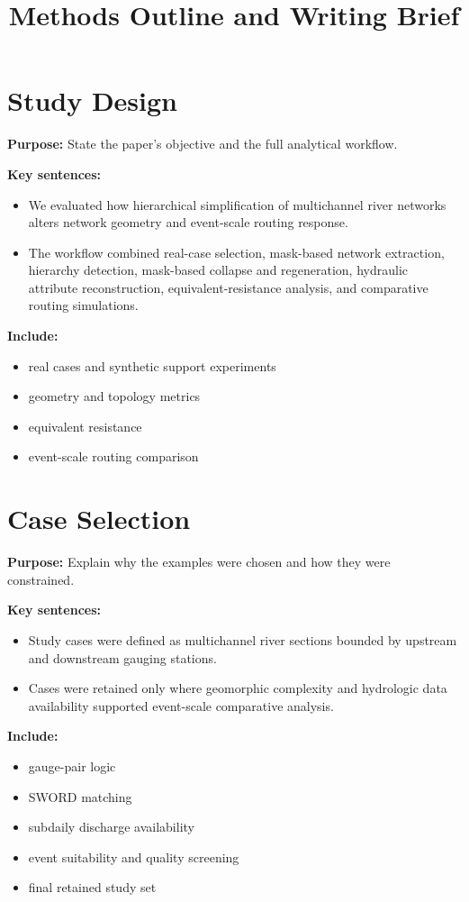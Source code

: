 \documentclass[11pt]{article}
\title{Methods Outline and Writing Brief}
\author{}
\date{}
\begin{document}
\maketitle

\section{Study Design}
\textbf{Purpose:} State the paper's objective and the full analytical workflow.

\textbf{Key sentences:}
\begin{itemize}
\item We evaluated how hierarchical simplification of multichannel river networks alters network geometry and event-scale routing response.
\item The workflow combined real-case selection, mask-based network extraction, hierarchy detection, mask-based collapse and regeneration, hydraulic attribute reconstruction, equivalent-resistance analysis, and comparative routing simulations.
\end{itemize}

\textbf{Include:}
\begin{itemize}
\item real cases and synthetic support experiments
\item geometry and topology metrics
\item equivalent resistance
\item event-scale routing comparison
\end{itemize}

\section{Case Selection}
\textbf{Purpose:} Explain why the examples were chosen and how they were constrained.

\textbf{Key sentences:}
\begin{itemize}
\item Study cases were defined as multichannel river sections bounded by upstream and downstream gauging stations.
\item Cases were retained only where geomorphic complexity and hydrologic data availability supported event-scale comparative analysis.
\end{itemize}

\textbf{Include:}
\begin{itemize}
\item gauge-pair logic
\item SWORD matching
\item subdaily discharge availability
\item event suitability and quality screening
\item final retained study set
\end{itemize}
\end{document}
